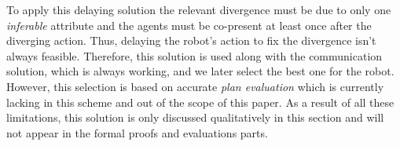 \documentclass[letterpaper]{article} %
\begin{document}







To apply this delaying solution the relevant divergence must be due to only one \textit{inferable} attribute and the agents must be co-present at least once after the diverging action. Thus, delaying the robot's action to fix the divergence isn't always feasible. Therefore, this solution is used along with the communication solution, which is always working, and we later select the best one for the robot. However, this selection is based on accurate \textit{plan evaluation} which is currently lacking in this scheme and out of the scope of this paper.
As a result of all these limitations, this solution is only discussed qualitatively in this section and will not appear in the formal proofs and evaluations parts. 
\end{document}
